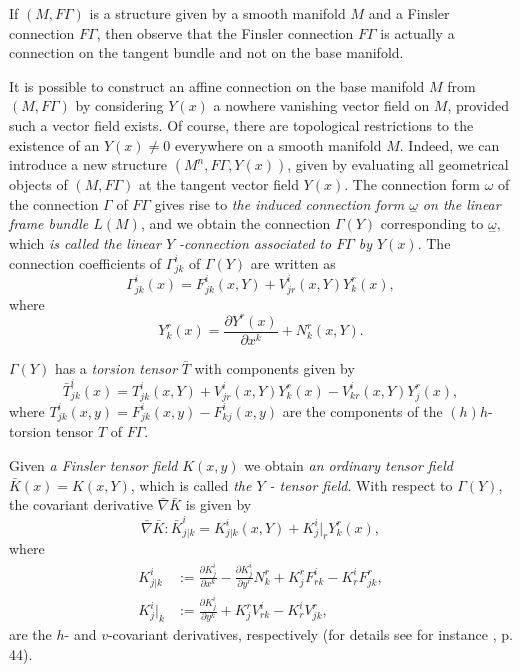 \documentclass[aps,superscriptaddress, showpacs,preprintnumbers, superscriptaddress, nofootinbibt,twocolumn]{revtex4-2}
\begin{document}
If $(M,F\Gamma )$ is a structure given by a smooth manifold $M$ and a Finsler connection $F\Gamma$, then observe that the Finsler connection $F\Gamma$ is actually a connection on the tangent bundle and not on the base manifold.

It is possible to construct an affine connection on the base manifold $M$ from $(M,F\Gamma )$ by considering $Y(x)$ a nowhere vanishing vector field on $M$, provided such a vector field exists. Of course, there are topological restrictions to the existence of an $Y(x)\neq 0$ everywhere on a smooth manifold $M$. Indeed, we can introduce a new  structure $(M^n,F\Gamma ,Y(x))$, given by evaluating all geometrical objects of $(M,F\Gamma)$ at the tangent vector field $Y(x)$. The connection form $\omega $ of the
connection $\Gamma $ of $F\Gamma $ gives rise to {\it the induced connection form
$\underset{-}{\omega }$ on the linear frame bundle $L(M)$}, and we obtain the connection $\Gamma
\left( Y\right) $ corresponding to $\underset{-}{\omega }$, which {\it is called
the linear $Y$ -connection associated to $F\Gamma $ by $Y(x)$}. The
connection coefficients of $\Gamma _{jk}^{i}$ of $\Gamma \left( Y\right) $
are written as
\begin{equation}
\Gamma _{jk}^{i}(x)=F_{jk}^{i}(x,Y)+V_{jr}^{i}(x,Y)Y_{k}^{r}(x),
\end{equation}%
where
\begin{equation}
Y_{k}^{r}(x)=\frac{\partial Y^{r}(x)}{\partial x^{k}}+N_{k}^{r}(x,Y).
\end{equation}

$\Gamma (Y)$ has a {\it torsion tensor} $\bar{T}$ with components given by
\begin{equation}
\bar{T}_{jk}^{i}(x)=T_{jk}^{i}(x,Y)+V_{jr}^{i}\left( x,Y\right)
Y_{k}^{r}(x)-V_{kr}^{i}\left( x,Y\right) Y_{j}^{r}(x),
\end{equation}%
where $T_{jk}^{i}(x,y)=F_{jk}^{i}(x,y)-F_{kj}^{i}(x,y)$ are the components
of the $(h)h$-torsion tensor $T$ of $F\Gamma $.

Given {\it a Finsler tensor field} $K(x,y)$ we obtain {\it an ordinary tensor field} $%
\bar{K}\left( x\right) =K\left( x,Y\right)$, which is called {\it the $Y$ -
tensor field}. With respect to $\Gamma \left( Y\right) $,  the covariant
derivative $\bar{\nabla}\bar{K}$ is given by
\begin{equation}
\bar{\nabla}\bar{K}:\bar{K}_{j|k}^{i}=K_{j|k}^{i}\left( x,Y\right)
+K_{j}^{i}|_{r}Y_{k}^{r}(x),
\end{equation}
where
\begin{equation*}
    \begin{split}
        K_{j|k}^{i} &:= \frac{\partial K^i_j}{\partial x^k}-
        \frac{\partial K^i_j}{\partial y^r}N^r_k+K^r_jF^i_{rk}-K^i_rF^r_{jk},\\
        K_{j}^{i}|_{k} &:=\frac{\partial K^i_j}{\partial y^k}+
        K_j^rV^i_{rk}-K^i_rV^r_{jk},
    \end{split}
\end{equation*}
are the $h$- and $v$-covariant derivatives, respectively (for details see for instance \cite{Bao}, p. 44).
\end{document}
